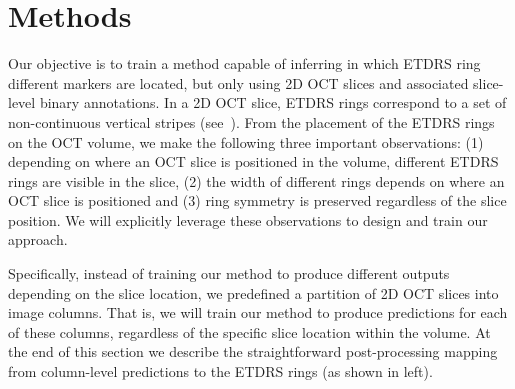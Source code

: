 \section{Methods}
\label{sec:oct_method}
Our objective is to train a method capable of inferring in which ETDRS ring different markers are located, but only using 2D OCT slices and associated slice-level binary annotations. In a 2D OCT slice, ETDRS rings correspond to a set of non-continuous vertical stripes (see~). From the placement of the ETDRS rings on the OCT volume, we make the following three important observations: (1) depending on where an OCT slice is positioned in the volume, different ETDRS rings are visible in the slice, (2) the width of different rings depends on where an OCT slice is positioned and (3) ring symmetry is preserved regardless of the slice position. We will explicitly leverage these observations to design and train our approach.



Specifically, instead of training our method to produce different outputs depending on the slice location, we predefined a partition of 2D OCT slices into image columns. That is, we will train our method to produce predictions for each of these columns, regardless of the specific slice location within the volume. At the end of this section we describe the straightforward post-processing mapping from column-level predictions to the ETDRS rings (as shown in  left).


